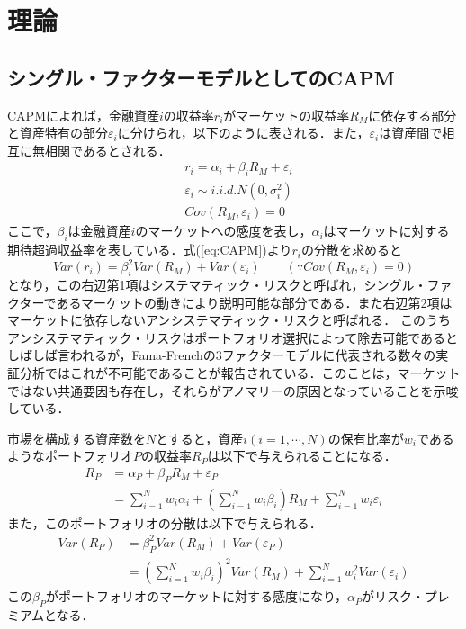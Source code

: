 \documentclass[11pt]{jreport}
\begin{document}
\chapter{理論}
\section{シングル・ファクターモデルとしてのCAPM}
CAPMによれば，金融資産$i$の収益率$r_i$がマーケットの収益率$R_M$に依存する部分と資産特有の部分$\varepsilon_i$に分けられ，以下のように表される．また，$\varepsilon_i$は資産間で相互に無相関であるとされる．%
\begin{equation}
\begin{split}
&r_i = \alpha_i + \beta_iR_M + \varepsilon_i\\
&\varepsilon_i \sim i.i.d.N(0,\sigma_i^2)\\
&Cov(R_M, \varepsilon_i) = 0
\label{eq:CAPM}
\end{split}
\end{equation}
ここで，$\beta_i$は金融資産$i$のマーケットへの感度を表し，$\alpha_i$はマーケットに対する期待超過収益率を表している．式(\ref{eq:CAPM})より$r_i$の分散を求めると
\begin{equation}
Var(r_i) = \beta_i^2Var(R_M) + Var(\varepsilon_i) \qquad (\text{∵}Cov(R_M, \varepsilon_i) = 0)
\label{eq:CAPM_var}
\end{equation}
となり，この右辺第1項はシステマティック・リスクと呼ばれ，シングル・ファクターであるマーケットの動きにより説明可能な部分である．また右辺第2項はマーケットに依存しないアンシステマティック・リスクと呼ばれる．
このうちアンシステマティック・リスクはポートフォリオ選択によって除去可能であるとしばしば言われるが，Fama-Frenchの3ファクターモデルに代表される数々の実証分析ではこれが不可能であることが報告されている．このことは，マーケットではない共通要因も存在し，それらがアノマリーの原因となっていることを示唆している．

市場を構成する資産数を$N$とすると，資産$i(i=1,\cdots,N)$の保有比率が$w_i$であるようなポートフォリオ$P$の収益率$R_P$は以下で与えられることになる．
\begin{equation}
\begin{split}
R_P &= \alpha_P + \beta_PR_M + \varepsilon_P\\
&= \sum_{i=1}^N w_i\alpha_i
+\left(\sum_{i=1}^N w_i\beta_i\right)R_M
+\sum_{i=1}^N w_i\varepsilon_i
\end{split}
\end{equation}
また，このポートフォリオの分散は以下で与えられる．
\begin{equation}
\begin{split}
Var(R_P) &= \beta_P^2 Var(R_M) + Var(\varepsilon_P)\\
& = \left(\sum_{i=1}^N w_i\beta_i\right)^2Var(R_M) + \sum_{i=1}^N w_i^2 Var(\varepsilon_i)
\end{split}
\end{equation}
この$\beta_P$がポートフォリオのマーケットに対する感度になり，$\alpha_P$がリスク・プレミアムとなる．
\end{document}
